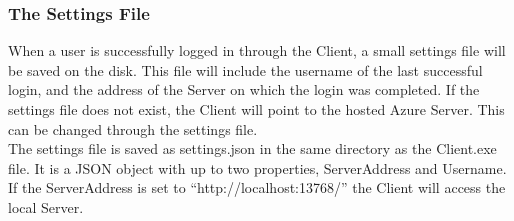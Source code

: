 \subsubsection{The Settings File}
When a user is successfully logged in through the Client, a small settings file will be saved on the disk. This file will include the username of the last successful login, and the address of the Server on which the login was completed. If the settings file does not exist, the Client will point to the hosted Azure Server. This can be changed through the settings file. \\
The settings file is saved as settings.json in the same directory as the Client.exe file. It is a JSON object with up to two properties, ServerAddress and Username. If the ServerAddress is set to “http://localhost:13768/” the Client will access the local Server.